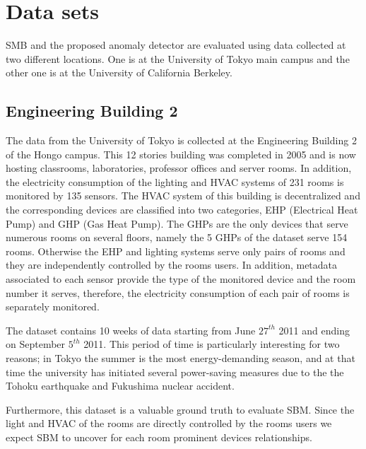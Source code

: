 \section{Data sets}
SMB and the proposed anomaly detector are evaluated using data collected at two different locations.
One is at the University of Tokyo main campus and the other one is at the University of California Berkeley.

\subsection{Engineering Building 2} \label{data:engbldg2}
The data from the University of Tokyo is collected at the Engineering Building 2 of the Hongo campus. 
This 12 stories building was completed in 2005 and is now hosting classrooms, laboratories, professor offices and server rooms.
In addition, the electricity consumption of the lighting and HVAC systems of 231 rooms is monitored by 135 sensors.
The HVAC system of this building is decentralized and the corresponding devices are classified into two categories, EHP (Electrical Heat Pump) and GHP (Gas Heat Pump).
The GHPs are the only devices that serve numerous rooms on several floors, namely the 5 GHPs of the dataset serve 154 rooms.
Otherwise the EHP and lighting systems serve only pairs of rooms and they are independently controlled by the rooms users.
In addition, metadata associated to each sensor provide the type of the monitored device and the room number it serves, therefore, the electricity consumption of each pair of rooms is separately monitored.

The dataset contains 10 weeks of data starting from June $27^{th}$ 2011 and ending on September $5^{th}$ 2011.
This period of time is particularly interesting for two reasons; in Tokyo the summer is the most energy-demanding season, and at that time the university has initiated several power-saving measures due to the the Tohoku earthquake and Fukushima nuclear accident.

Furthermore, this dataset is a valuable ground truth to evaluate SBM.
Since the light and HVAC of the rooms are directly controlled by the rooms users we expect SBM to uncover for each room prominent devices relationships.


